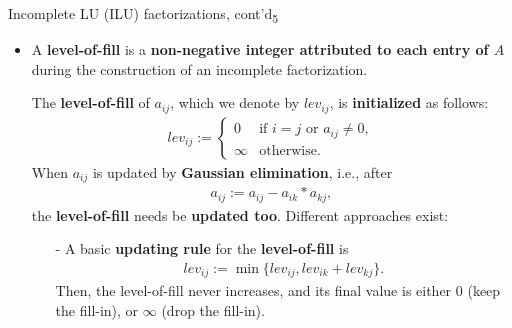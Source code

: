 \documentclass[t,usepdftitle=false]{beamer}
\begin{document}
\begin{frame}{Incomplete LU (ILU) factorizations, cont'd\textsubscript{5}}
\begin{itemize}
\item A \textbf{level-of-fill} is a \textbf{non-negative integer attributed to each entry of $A$} during the construction of an incomplete factorization.
\item[] The \textbf{level-of-fill} of $a_{ij}$, which we denote by $lev_{ij}$, is \textbf{initialized} as follows:
\begin{align}\label{eq:lev-init}
lev_{ij}:=
\begin{cases}
0&\text{if }i=j\text{ or }a_{ij}\neq 0,\\
\infty&\text{otherwise}.
\end{cases}
\end{align}
When $a_{ij}$ is updated by \textbf{Gaussian elimination}, i.e., after
\begin{align*}
a_{ij}:=a_{ij}-a_{ik}*a_{kj},
\end{align*}
the \textbf{level-of-fill} needs be \textbf{updated too}.
Different approaches exist:
\begin{itemize}\normalsize
\item[-] A basic \textbf{updating rule} for the \textbf{level-of-fill} is 
\begin{align*}
lev_{ij}:=\min\{lev_{ij},lev_{ik}+lev_{kj}\}.
\end{align*}
Then, the level-of-fill never increases, and its final value is either 0 (keep the fill-in), or $\infty$ (drop the fill-in).
\end{itemize}
\end{itemize}
\end{frame}
\end{document}
